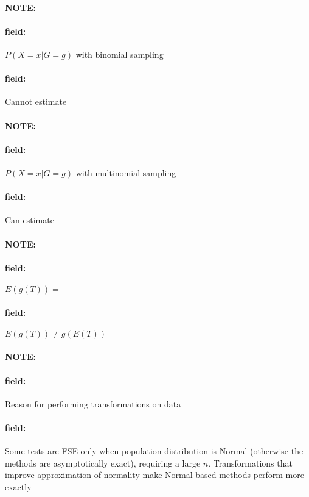\documentclass[12pt]{article}
\newenvironment{note}{\paragraph{NOTE:}}{}
\newenvironment{field}{\paragraph{field:}}{}
\begin{document}
\begin{note}
  \begin{field}
    $P(X = x | G = g)$ with binomial sampling
  \end{field}
  \begin{field}
    Cannot estimate
  \end{field}
\end{note}

\begin{note}
  \begin{field}
    $P(X = x | G = g)$ with multinomial sampling
  \end{field}
  \begin{field}
    Can estimate
  \end{field}
\end{note}

\begin{note}
  \begin{field}
    $E(g(T)) = $
  \end{field}
  \begin{field}
    $E(g(T)) \neq g(E(T))$
  \end{field}
\end{note}


\begin{note}
  \begin{field}
    Reason for performing transformations on data
  \end{field}
  \begin{field}
    Some tests are FSE only when population distribution is Normal (otherwise the methods are asymptotically exact), requiring a large $n$. Transformations that improve approximation of normality make Normal-based methods perform more exactly
  \end{field}
\end{note}
\end{document}
